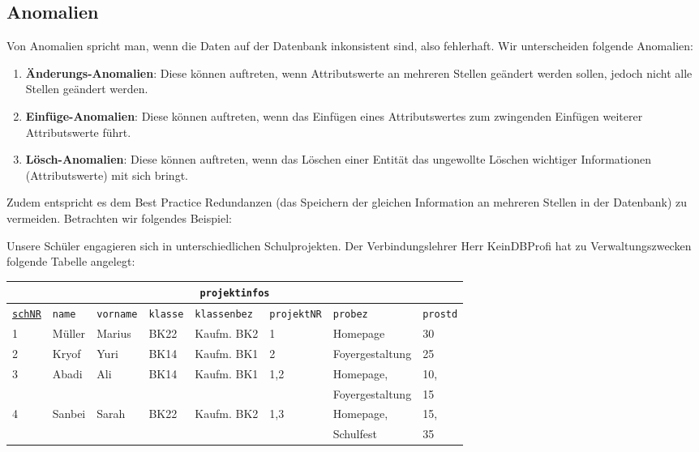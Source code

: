 \subsection[Anomalien]{Anomalien}\label{Anomalien}
Von Anomalien spricht man, wenn die Daten auf der Datenbank inkonsistent sind, also fehlerhaft. Wir unterscheiden folgende Anomalien:

\begin{tcolorbox}[title=Anomalien]
	\begin{enumerate}
		\item \textbf{Änderungs-Anomalien}: Diese können auftreten, wenn Attributswerte an mehreren Stellen geändert werden sollen, jedoch nicht alle Stellen geändert werden.
		\item \textbf{Einfüge-Anomalien}: Diese können auftreten, wenn das Einfügen eines Attributswertes zum zwingenden Einfügen weiterer Attributswerte führt.
		\item \textbf{Lösch-Anomalien}: Diese können auftreten, wenn das Löschen einer Entität das ungewollte Löschen wichtiger Informationen (Attributswerte) mit sich bringt.
	\end{enumerate}
\end{tcolorbox}
Zudem entspricht es dem Best Practice Redundanzen (das Speichern der gleichen Information an mehreren Stellen in der Datenbank) zu vermeiden. Betrachten wir folgendes Beispiel:

Unsere Schüler engagieren sich in unterschiedlichen Schulprojekten. Der Verbindungslehrer Herr KeinDBProfi hat zu Verwaltungszwecken folgende Tabelle angelegt:
\begin{tabular}{llllllll}
	\multicolumn{8}{c}{\lstinline!projektinfos!}\\
	\hline
	\underline{\lstinline!schNR!}&\lstinline!name!&\lstinline!vorname!&\lstinline!klasse!&\lstinline!klassenbez!&\lstinline!projektNR!&\lstinline!probez!&\lstinline!prostd!\\
	\hline
	1 &
	Müller &
	Marius &
	BK22 &
	Kaufm. BK2&
	1 &
	Homepage &
	30 \\
	2 &
	Kryof  &
	Yuri &
	BK14 &
	Kaufm. BK1&
	2 &
	Foyergestaltung &
	25 \\
	3 &
	Abadi &
	Ali &
	BK14 &
	Kaufm. BK1&
	1,2 &
	Homepage,&
	10,\\
	&&&&&&Foyergestaltung&15\\
	4 &
	Sanbei &
	Sarah &
	BK22 &
	Kaufm. BK2 &
	1,3 &
	Homepage,&
	15,  \\
	&&&&&&Schulfest&35\\
\end{tabular}

